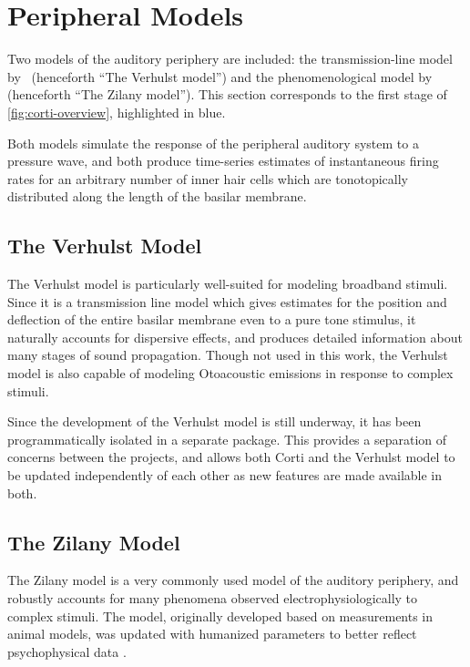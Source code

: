 \section{Peripheral Models} %
\label{sec:peripheral_models}
Two models of the auditory periphery are included: the transmission-line model by~\cite{Verhulst2015Functional} (henceforth ``The Verhulst model'') and the phenomenological model by~\cite{Zilany2014Updated} (henceforth ``The Zilany model'').  This section corresponds to the first stage of \autoref{fig:corti-overview}, highlighted in blue.

Both models simulate the response of the peripheral auditory system to a pressure wave, and both produce time-series estimates of instantaneous firing rates for an arbitrary number of inner hair cells which are tonotopically distributed along the length of the basilar membrane. 

\subsection{The Verhulst Model} %
\label{sub:the_verhulst_model1}
The Verhulst model is particularly well-suited for modeling broadband stimuli.  Since it is a transmission line model which gives estimates for the position and deflection of the entire basilar membrane even to a pure tone stimulus, it naturally accounts for dispersive effects, and produces detailed information about many stages of sound propagation. Though not used in this work, the Verhulst model is also capable of modeling Otoacoustic emissions in response to complex stimuli. 

Since the development of the Verhulst model is still underway, it has been programmatically isolated in a separate package.  This provides a separation of concerns between the projects, and allows both Corti and the Verhulst model to be updated independently of each other as new features are made available in both.
\subsection{The Zilany Model} %
\label{sub:the_zilany_model}
The Zilany model is a very commonly used model of the auditory periphery, and robustly accounts for many phenomena observed electrophysiologically to complex stimuli.  The model, originally developed based on measurements in animal models, was updated with humanized parameters to better reflect psychophysical data \citep{Zilany2014Updated,Zilany2007Predictions,Zilany2006Modeling}. 

